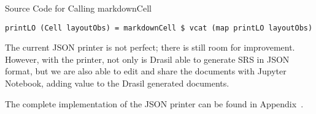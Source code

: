 \begin{listing}[h]
	\caption{Source Code for Calling markdownCell}
	\label{code:callmarkdownCell}
	\begin{lstlisting}[language=haskell1]
		printLO (Cell layoutObs) = markdownCell $ vcat (map printLO layoutObs)
	\end{lstlisting}
\end{listing}

The current JSON printer is not perfect; there is still room for improvement. 
 However, with the printer, not only is Drasil able 
to generate SRS in JSON format, but we are also able to edit and share the 
documents with Jupyter Notebook, adding value to the Drasil generated 
documents. 
 
The complete implementation of the JSON printer can be found in 
Appendix~.